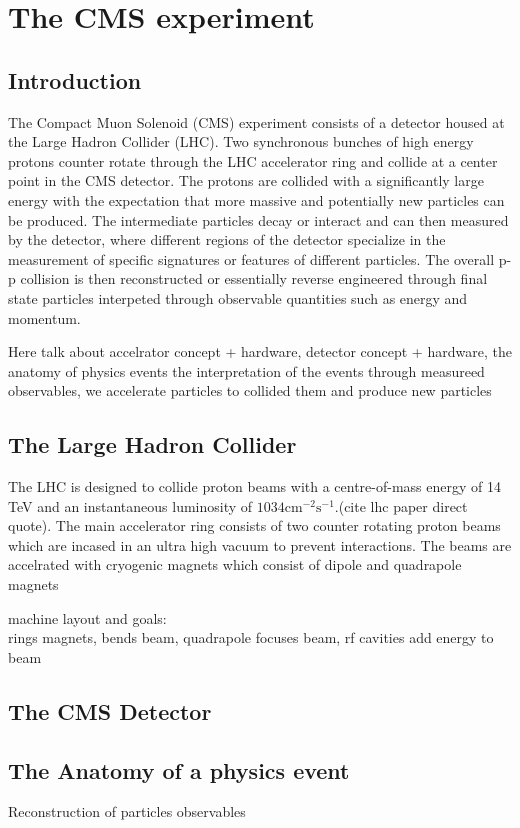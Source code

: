 \setcounter{secnumdepth}{3}
\setcounter{tocdepth}{3}
\setlength{\parskip}{\smallskipamount}
\setlength{\parindent}{0pt}


\makeatletter


\providecommand{\tabularnewline}{\\}


\makeatother


\chapter{The CMS experiment}

\section{Introduction} The Compact Muon Solenoid (CMS) experiment consists of a detector housed at the Large Hadron Collider (LHC). Two synchronous bunches of high energy protons counter rotate through the LHC accelerator ring and collide at a center point in the CMS detector.  The protons are collided with a significantly large energy with the expectation that more massive and potentially new particles can be produced. The intermediate particles decay or interact and can then measured by the detector, where different regions of the detector specialize in the measurement of specific signatures or features of different particles. The overall p-p collision is then reconstructed or essentially reverse engineered through final state particles interpeted through observable quantities such as energy and momentum.   

Here talk about accelrator concept + hardware, detector concept + hardware, the anatomy of physics events the interpretation of the events through measureed observables, 
we accelerate particles to collided them and produce new particles


\section{The Large Hadron Collider}
The LHC is designed to collide proton beams with a centre-of-mass energy of 14 TeV and an instantaneous luminosity of $1034 \text{cm}^{-2}\text{s}^{-1}$.(cite lhc paper direct quote). The main accelerator ring consists of two counter rotating proton beams which are incased in an ultra high vacuum to prevent interactions. The beams are accelrated with cryogenic magnets which consist of dipole and quadrapole magnets

machine layout and goals: \\
rings magnets, bends beam, quadrapole focuses beam, rf cavities add energy to beam


\section{The CMS Detector}


\section{The Anatomy of a physics event}
	Reconstruction of particles
	observables
